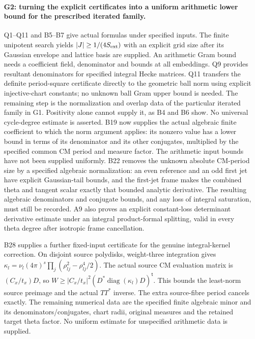 \documentclass[11pt]{article}
\theoremstyle{definition}\newtheorem{definition}[theorem]{Definition}\newtheorem{remark}[theorem]{Remark}
\begin{document}
\paragraph{G2: turning the explicit certificates into a uniform
arithmetic lower bound for the prescribed iterated family.}
Q1--Q11 and B5--B7 give actual formulas under specified inputs.
The finite unipotent search yields $|J|\geq1/(4S_{\rm ext})$ with
an explicit grid size after its Gaussian envelope and lattice basis
are supplied. An arithmetic Gram bound needs a coefficient field,
denominator and bounds at all embeddings. Q9 provides resultant
denominators for specified integral Hecke matrices. Q11 transfers
the definite period-square certificate directly to the geometric
ball norm using explicit injective-chart constants; no unknown
ball Gram upper bound is needed. The remaining
step is the normalization and overlap data of the particular
iterated family in G1. Positivity alone cannot supply it, as B4
and B6 show. No universal cycle-degree estimate is asserted.
B19 now supplies the actual algebraic finite coefficient to
which the norm argument applies: its nonzero value has a lower
bound in terms of its denominator and its other conjugates,
multiplied by the specified common CM period and measure factor.
The arithmetic input bounds have not been supplied uniformly.
B22 removes the unknown absolute CM-period size by a specified
algebraic normalization: an even reference and an odd first jet
have explicit Gaussian-tail bounds, and the first-jet frame
makes the combined theta and tangent scalar exactly that
bounded analytic derivative. The resulting algebraic
denominators and conjugate bounds, and any loss of integral
saturation, must still be recorded. A9 also proves an explicit
constant-loss determinant derivative estimate under an integral
product-formal splitting, valid in every theta degree after
isotropic frame cancellation.

B28 supplies a further fixed-input certificate for the genuine
integral-kernel correction. On disjoint source polydisks,
weight-three integration gives
$\kappa_l=\nu_l(4\pi)^s\prod_j(\rho_{lj}^2-\rho_{lj}^4/2)$.
The actual source CM evaluation matrix is $(C_x/t_x)D$,
so $W\geq|C_x/t_x|^2(D^*\operatorname{diag}(\kappa_l)D)^{\mathsf t}$.
This bounds the least-norm source preimage and the actual
$TT^*$ inverse. The extra source-fibre period cancels exactly.
The remaining numerical data are the specified finite
algebraic minor and its denominators/conjugates, chart radii,
original measures and the retained target theta factor.
No uniform estimate for unspecified arithmetic data is supplied.
\end{document}
